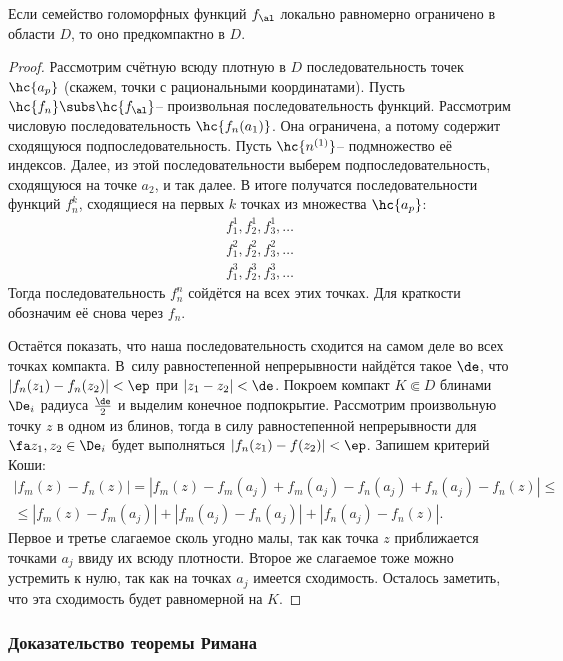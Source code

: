 \documentclass[a4paper]{article}
\begin{document}
\begin{theorem}
Если семейство голоморфных функций $f_\al$ локально равномерно ограничено в области $D$, то оно предкомпактно в $D$.
\end{theorem}
\begin{proof}
Рассмотрим счётную всюду плотную в $D$ последовательность точек $\hc{a_p}$ (скажем, точки с рациональными координатами).
Пусть $\hc{f_n}\subs\hc{f_\al}$-- произвольная последовательность функций. Рассмотрим числовую
последовательность $\hc{f_n(a_1)}$. Она ограничена, а потому содержит сходящуюся подпоследовательность.
Пусть $\hc{n^{(1)}}$-- подмножество её индексов. Далее, из этой последовательности выберем подпоследовательность,
сходящуюся на точке $a_2$, и так далее. В итоге получатся последовательности функций $f_n^{k}$, сходящиеся на первых $k$
точках из множества $\hc{a_p}$:
\begin{align*}
f_1^1, f_2^1, f_3^1, \ldots\\
f_1^2, f_2^2, f_3^2, \ldots\\
f_1^3, f_2^3, f_3^3, \ldots
\end{align*}
Тогда последовательность $f_n^n$ сойдётся на всех этих точках. Для краткости обозначим её снова через $f_n$.

Остаётся показать, что наша последовательность сходится на самом деле во всех точках компакта. В~силу
равностепенной непрерывности найдётся такое $\de$, что $|f_n(z_1)-f_n(z_2)|<\ep$ при
$|z_1-z_2|<\de$. Покроем компакт $K \Subset D$ блинами $\De_i$ радиуса $\frac{\de}{2}$ и выделим конечное
подпокрытие. Рассмотрим произвольную точку $z$ в одном из блинов, тогда в силу равностепенной непрерывности
для $\fa z_1,z_2\in \De_i$ будет выполняться $|f_n(z_1)-f(z_2)|<\ep$. Запишем критерий Коши:
\begin{multline*}
|f_m(z)-f_n(z)| = |f_m(z) - f_m(a_j) + f_m(a_j) - f_n(a_j) + f_n(a_j) - f_n(z)|\le\\\le
 |f_m(z) - f_m(a_j)| + |f_m(a_j) - f_n(a_j)| + |f_n(a_j) - f_n(z)|.
\end{multline*}
Первое и третье слагаемое сколь угодно малы, так как точка $z$ приближается точками $a_j$ ввиду их всюду плотности.
Второе же слагаемое тоже можно устремить к нулю, так как на точках $a_j$ имеется сходимость. Осталось заметить, что
эта сходимость будет равномерной на $K$.
\end{proof}

\subsubsection{Доказательство теоремы Римана}
\end{document}
